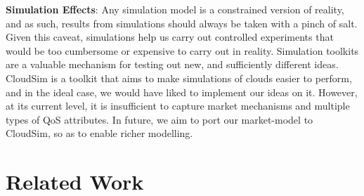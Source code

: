 \documentclass[10pt,journal,compsoc]{IEEEtran}
\begin{document}
\textbf{Simulation Effects}: Any simulation model is a constrained version of reality, and as such, results from simulations should always be taken with a pinch of salt. Given this caveat, simulations help us carry out controlled experiments that would be too cumbersome or expensive to carry out in reality. Simulation toolkits are a valuable mechanism for testing out new, and sufficiently different ideas. CloudSim \cite{Buyya2009Cloudbus} is a toolkit that aims to make simulations of clouds easier to perform, and in the ideal case, we would have liked to implement our ideas on it. However, at its current level, it is insufficient to capture market mechanisms and multiple types of QoS attributes. In future, we aim to port our market-model to CloudSim, so as to enable richer modelling.

\section{Related Work}
    
\end{document}
